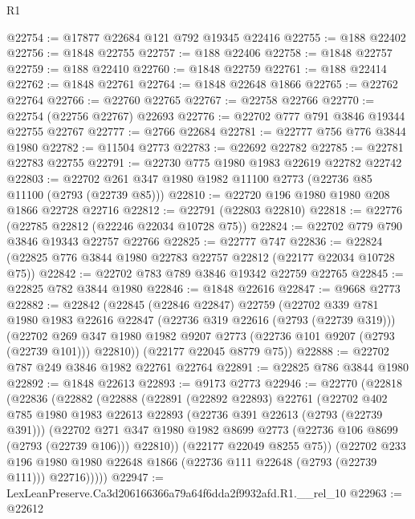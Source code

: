 \begin{lexlean}{R1}
\begin{coremodule}
@22754 := @17877 @22684 @121 @792 @19345 @22416
@22755 := @188 @22402
@22756 := @1848 @22755
@22757 := @188 @22406
@22758 := @1848 @22757
@22759 := @188 @22410
@22760 := @1848 @22759
@22761 := @188 @22414
@22762 := @1848 @22761
@22764 := @1848 @22648 @1866
@22765 := @22762 @22764
@22766 := @22760 @22765
@22767 := @22758 @22766
@22770 := @22754 (@22756 @22767) @22693
@22776 := @22702 @777 @791 @3846 @19344 @22755 @22767
@22777 := @2766 @22684
@22781 := @22777 @756 @776 @3844 @1980
@22782 := @11504 @2773
@22783 := @22692 @22782
@22785 := @22781 @22783 @22755
@22791 := @22730 @775 @1980 @1983 @22619 @22782 @22742
@22803 := @22702 @261 @347 @1980 @1982 @11100 @2773 (@22736 @85 @11100 (@2793 (@22739 @85)))
@22810 := @22720 @196 @1980 @1980 @208 @1866 @22728 @22716
@22812 := @22791 (@22803 @22810)
@22818 := @22776 (@22785 @22812 (@22246 @22034 @10728 @75))
@22824 := @22702 @779 @790 @3846 @19343 @22757 @22766
@22825 := @22777 @747
@22836 := @22824 (@22825 @776 @3844 @1980 @22783 @22757 @22812 (@22177 @22034 @10728 @75))
@22842 := @22702 @783 @789 @3846 @19342 @22759 @22765
@22845 := @22825 @782 @3844 @1980
@22846 := @1848 @22616
@22847 := @9668 @2773
@22882 := @22842
    (@22845
      (@22846 @22847)
      @22759
      (@22702
        @339
        @781
        @1980
        @1983
        @22616
        @22847
        (@22736 @319 @22616 (@2793 (@22739 @319)))
        (@22702 @269 @347 @1980 @1982 @9207 @2773 (@22736 @101 @9207 (@2793 (@22739 @101))) @22810))
      (@22177 @22045 @8779 @75))
@22888 := @22702 @787 @249 @3846 @1982 @22761 @22764
@22891 := @22825 @786 @3844 @1980
@22892 := @1848 @22613
@22893 := @9173 @2773
@22946 := @22770
    (@22818
      (@22836
        (@22882
          (@22888
            (@22891
              (@22892 @22893)
              @22761
              (@22702
                @402
                @785
                @1980
                @1983
                @22613
                @22893
                (@22736 @391 @22613 (@2793 (@22739 @391)))
                (@22702
                  @271
                  @347
                  @1980
                  @1982
                  @8699
                  @2773
                  (@22736 @106 @8699 (@2793 (@22739 @106)))
                  @22810))
              (@22177 @22049 @8255 @75))
            (@22702
              @233
              @196
              @1980
              @1980
              @22648
              @1866
              (@22736 @111 @22648 (@2793 (@22739 @111)))
              @22716)))))
@22947 := LexLeanPreserve.Ca3d206166366a79a64f6dda2f9932afd.R1.__rel_10
@22963 := @22612

\end{coremodule}
\end{lexlean}
